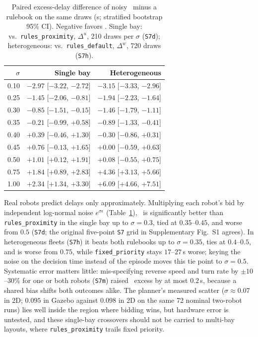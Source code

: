 \begin{table}[!t]\centering
\caption{Paired excess-delay difference of noisy \cb\ minus a rulebook on the same draws (s; stratified bootstrap 95\% CI). Negative favors \cb. Single bay: vs.\ \texttt{rules\_proximity}, $\Delta^{u}$, 210 draws per $\sigma$ (\texttt{S7d}); heterogeneous: vs.\ \texttt{rules\_default}, $\Delta^{w}$, 720 draws (\texttt{S7h}).}
\label{tab:sigma}
{\footnotesize\setlength{\tabcolsep}{4pt}
\begin{tabular}{@{}rrr@{}}\toprule
$\sigma$ & Single bay & Heterogeneous \\\midrule
0.10 & $-2.97$ [$-3.22$, $-2.72$] & $-3.15$ [$-3.33$, $-2.96$] \\
0.25 & $-1.45$ [$-2.06$, $-0.81$] & $-1.94$ [$-2.23$, $-1.64$] \\
0.30 & $-0.85$ [$-1.51$, $-0.15$] & $-1.46$ [$-1.79$, $-1.11$] \\
0.35 & $-0.21$ [$-0.99$, $+0.58$] & $-0.89$ [$-1.33$, $-0.41$] \\
0.40 & $+0.39$ [$-0.46$, $+1.30$] & $-0.30$ [$-0.86$, $+0.31$] \\
0.45 & $+0.76$ [$-0.13$, $+1.65$] & $+0.00$ [$-0.59$, $+0.63$] \\
0.50 & $+1.01$ [$+0.12$, $+1.91$] & $+0.08$ [$-0.55$, $+0.75$] \\
0.75 & $+1.84$ [$+0.89$, $+2.83$] & $+4.36$ [$+3.13$, $+5.66$] \\
1.00 & $+2.34$ [$+1.34$, $+3.30$] & $+6.09$ [$+4.66$, $+7.51$] \\\bottomrule
\end{tabular}}
\end{table}

Real robots predict delays only approximately. Multiplying each robot's bid by independent log-normal noise $e^{\sigma\epsilon}$ (Table~\ref{tab:sigma}), \cb\ is significantly better than \texttt{rules\_proximity} in the single bay up to $\sigma=0.3$, tied at $0.35$--$0.45$, and worse from $0.5$ (\texttt{S7d}; the original five-point \texttt{S7} grid in Supplementary Fig.~S1 agrees). In heterogeneous fleets (\texttt{S7h}) it beats both rulebooks up to $\sigma=0.35$, ties at $0.4$--$0.5$, and is worse from $0.75$, while \texttt{fixed\_priority} stays $17$--$27$\,s worse; keying the noise on the decision time instead of the episode moves this tie point to $\sigma=0.5$. Systematic error matters little: mis-specifying reverse speed and turn rate by $\pm10$--$30\%$ for one or both robots (\texttt{S7m}) raised \cb\ excess by at most $0.2$\,s, because a shared bias shifts both outcomes alike. The planner's measured scatter ($\sigma\approx0.07$ in 2D; $0.095$ in Gazebo against $0.098$ in 2D on the same 72 nominal two-robot runs) lies well inside the region where bidding wins, but hardware error is untested, and these single-bay crossovers should not be carried to multi-bay layouts, where \texttt{rules\_proximity} trails fixed priority.

